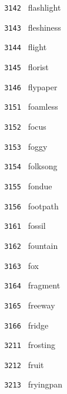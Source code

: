 \documentclass[11pt]{article}
\begin{document}
\begin{multicols}{6}
\noindent \texttt{ 3142 } \hspace{1mm} flashlight  \par
\noindent \texttt{ 3143 } \hspace{1mm} fleshiness  \par
\noindent \texttt{ 3144 } \hspace{1mm} flight  \par
\noindent \texttt{ 3145 } \hspace{1mm} florist  \par
\noindent \texttt{ 3146 } \hspace{1mm} flypaper  \par
\noindent \texttt{ 3151 } \hspace{1mm} foamless  \par
\noindent \texttt{ 3152 } \hspace{1mm} focus  \par
\noindent \texttt{ 3153 } \hspace{1mm} foggy  \par
\noindent \texttt{ 3154 } \hspace{1mm} folksong  \par
\noindent \texttt{ 3155 } \hspace{1mm} fondue  \par
\noindent \texttt{ 3156 } \hspace{1mm} footpath  \par
\noindent \texttt{ 3161 } \hspace{1mm} fossil  \par
\noindent \texttt{ 3162 } \hspace{1mm} fountain  \par
\noindent \texttt{ 3163 } \hspace{1mm} fox  \par
\noindent \texttt{ 3164 } \hspace{1mm} fragment  \par
\noindent \texttt{ 3165 } \hspace{1mm} freeway  \par
\noindent \texttt{ 3166 } \hspace{1mm} fridge  \par
\noindent \texttt{ 3211 } \hspace{1mm} frosting  \par
\noindent \texttt{ 3212 } \hspace{1mm} fruit  \par
\noindent \texttt{ 3213 } \hspace{1mm} fryingpan  \par

\end{multicols}
\end{document}

